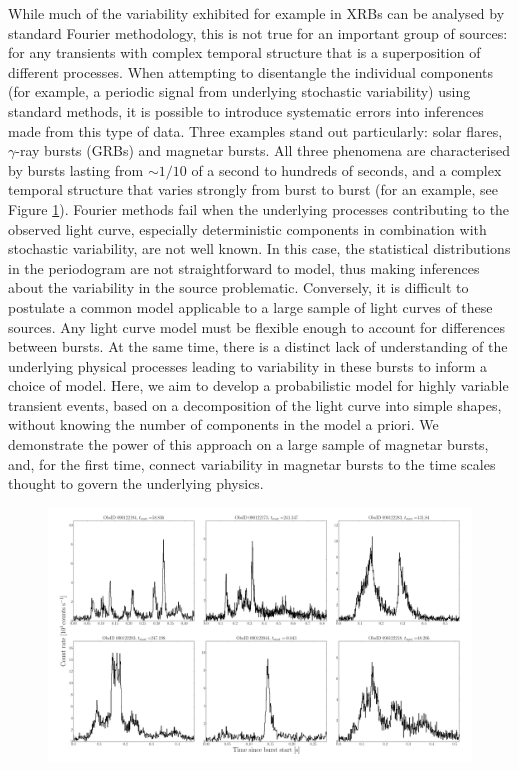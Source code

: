 \documentclass[12pt]{emulateapj}
\begin{document}
While much of the variability exhibited for example in XRBs can be analysed by standard Fourier methodology, this is not true for an important group of sources: for any transients 
with complex temporal structure that is a superposition of different processes. When attempting to disentangle the individual components (for example, a periodic signal from underlying stochastic variability)
using standard methods, it is possible to introduce systematic errors into inferences made from this type of data. Three examples stand out particularly: solar flares, $\gamma$-ray bursts (GRBs) and magnetar bursts.  All three phenomena are characterised by bursts lasting from $\sim 1/10$ of a second to hundreds of seconds, and a 
complex temporal structure that varies strongly from burst to burst (for an example, see Figure \ref{fig:example_bursts}). 
Fourier methods fail when the underlying processes contributing to the observed light curve, especially deterministic components in combination with stochastic variability, are not well known. In this case,
the statistical distributions in the periodogram are not straightforward to model, thus making inferences about the variability in the source problematic. Conversely, 
it is difficult to postulate a common model applicable to a large sample of light curves of these sources. Any light curve model must be flexible enough to account for differences between bursts. 
At the same time, there is a distinct lack of understanding of the underlying physical processes leading to variability in these bursts to inform a choice of model. Here, we aim to develop a probabilistic 
model for highly variable transient events, based on a decomposition of the light curve into simple shapes, without knowing the number of components in the model a priori. We demonstrate the 
power of this approach on a large sample of magnetar bursts, and, for the first time, connect variability in magnetar bursts to the time scales thought to govern the underlying physics.
\begin{figure}[h]
\begin{center}
\includegraphics[width=18cm]{example_bursts.pdf}
\caption{}
\label{fig:example_bursts}
\end{center}
\end{figure}
\end{document}
